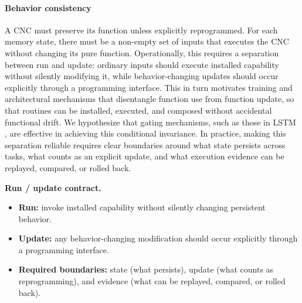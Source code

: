 \paragraph{Behavior consistency}
A CNC must preserve its function unless explicitly reprogrammed. For each memory state, there must be a non-empty set of inputs that executes the CNC without changing its pure function.
Operationally, this requires a separation between run and update: ordinary inputs should execute installed capability without silently modifying it, while behavior-changing updates should occur explicitly through a programming interface.
This in turn motivates training and architectural mechanisms that disentangle function use from function update, so that routines can be installed, executed, and composed without accidental functional drift.
We hypothesize that gating mechanisms, such as those in LSTM \citep{hochreiter1997long}, are effective in achieving this conditional invariance.
In practice, making this separation reliable requires clear boundaries around what state persists across tasks, what counts as an explicit update, and what execution evidence can be replayed, compared, or rolled back.

\begin{tcolorbox}[
  colback=apricotglaze!40!white,
  colframe=metablue!40,
  interior style={shade,shading angle=315,left color=white,right color=apricotglaze!55!white},
  boxrule=0pt,
  borderline west={1pt}{0pt}{gray!60},
  left=6pt,right=4pt,top=3pt,bottom=3pt]
\small
\textbf{Run / update contract.}
\begin{itemize}
  \setlength{\itemsep}{2pt}
  \setlength{\topsep}{2pt}
  \item \textbf{Run:} invoke installed capability without silently changing persistent behavior.
  \item \textbf{Update:} any behavior-changing modification should occur explicitly through a programming interface.
  \item \textbf{Required boundaries:} state (what persists), update (what counts as reprogramming), and evidence (what can be replayed, compared, or rolled back).
\end{itemize}
\end{tcolorbox}

